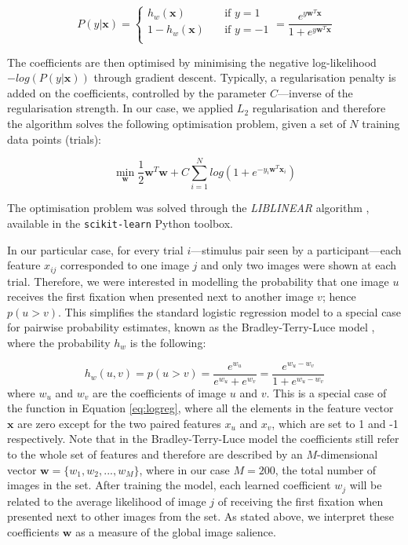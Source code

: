{\[   
P(y|\mathbf{x}) = 
     \begin{cases}
       h_{w}(\mathbf{x})  &\quad\text{if } y = 1\\
       1 - h_{w}(\mathbf{x})  &\quad\text{if } y = -1\\
     \end{cases}
= \frac{e^{y\mathbf{w}^{T}\mathbf{x}}}{1 + e^{y\mathbf{w}^{T}\mathbf{x}}}
\]

The coefficients are then optimised by minimising the negative log-likelihood $-log(P(y|\mathbf{x}))$ through gradient descent. Typically, a regularisation penalty is added on the coefficients, controlled by the parameter $C$---inverse of the regularisation strength. In our case, we applied $L_2$ regularisation and therefore the algorithm solves the following optimisation problem, given a set of $N$ training data points (trials):

\begin{equation}
\label{eq:objective}
\min_{\mathbf{w}} \frac{1}{2}\mathbf{w}^{T}\mathbf{w} + C\sum_{i=1}^{N}log(1 + e^{-y_{i}\mathbf{w}^{T}\mathbf{x}_{i}})
\end{equation}

The optimisation problem was solved through the \textit{LIBLINEAR} algorithm \citep{fan2008liblinear}, available in the \texttt{scikit-learn} Python toolbox.

In our particular case, for every trial $i$---stimulus pair seen by a participant---each feature $x_{ij}$ corresponded to one image $j$ and only two images were shown at each trial. Therefore, we were interested in modelling the probability that one image $u$ receives the first fixation when presented next to another image $v$; hence $p(u > v)$. This simplifies the standard logistic regression model to a special case for pairwise probability estimates, known as the Bradley-Terry-Luce model \citep{bradley1952pairwisecomp, luce2005pairwisecomp}, where the probability $h_{w}$ is the following:

\begin{equation}
\label{eq:btl}
 h_{w}(u,v) = p(u > v) = \frac{e^{w_{u}}}{e^{w_{u}} + e^{w_{v}}} = \frac{e^{w_{u}-w_{v}}}{1 + e^{w_{u}-w_{v}}}
\end{equation}
%
where $w_{u}$ and $w_{v}$ are the coefficients of image $u$ and $v$. This is a special case of the function in Equation \ref{eq:logreg}, where all the elements in the feature vector $\mathbf{x}$ are zero except for the two paired features $x_{u}$ and $x_{v}$, which are set to 1 and -1 respectively. Note that in the Bradley-Terry-Luce model the coefficients still refer to the whole set of features and therefore are described by an $M$-dimensional vector $\mathbf{w} = \{w_{1}, w_{2}, ..., w_{M}\}$, where in our case $M=200$, the total number of images in the set. After training the model, each learned coefficient $w_{j}$ will be related to the average likelihood of image $j$ of receiving the first fixation when presented next to other images from the set. As stated above, we interpret these coefficients $\mathbf{w}$ as a measure of the global image salience.

}
